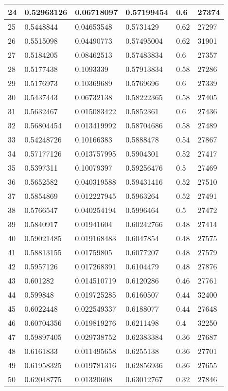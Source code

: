 \begin{longtable}{|l|l|l|l|l|l|}
24 & 0.52963126 & 0.06718097 & 0.57199454 & 0.6 & 27374 \\ \hline 
25 & 0.5448844 & 0.04653548 & 0.5731429 & 0.62 & 27297 \\ \hline 
26 & 0.5515098 & 0.04490773 & 0.57495004 & 0.62 & 31901 \\ \hline 
27 & 0.5184205 & 0.08462513 & 0.57483834 & 0.6 & 27357 \\ \hline 
28 & 0.5177438 & 0.1093339 & 0.57913834 & 0.58 & 27286 \\ \hline 
29 & 0.5176973 & 0.10369689 & 0.5769696 & 0.6 & 27339 \\ \hline 
30 & 0.5437443 & 0.06732138 & 0.58222365 & 0.58 & 27405 \\ \hline 
31 & 0.5632467 & 0.015083422 & 0.5852361 & 0.6 & 27436 \\ \hline 
32 & 0.56804454 & 0.013419992 & 0.58704686 & 0.58 & 27489 \\ \hline 
33 & 0.54248726 & 0.10166383 & 0.5888478 & 0.54 & 27867 \\ \hline 
34 & 0.57177126 & 0.013757995 & 0.5904301 & 0.52 & 27417 \\ \hline 
35 & 0.5397311 & 0.10079397 & 0.59256476 & 0.5 & 27469 \\ \hline 
36 & 0.5652582 & 0.040319588 & 0.59431416 & 0.52 & 27510 \\ \hline 
37 & 0.5854869 & 0.012227945 & 0.5963264 & 0.52 & 27491 \\ \hline 
38 & 0.5766547 & 0.040254194 & 0.5996464 & 0.5 & 27472 \\ \hline 
39 & 0.5840917 & 0.01941604 & 0.60242766 & 0.48 & 27414 \\ \hline 
40 & 0.59021485 & 0.019168483 & 0.6047854 & 0.48 & 27575 \\ \hline 
41 & 0.58813155 & 0.01759805 & 0.6077207 & 0.48 & 27579 \\ \hline 
42 & 0.5957126 & 0.017268391 & 0.6104479 & 0.48 & 27876 \\ \hline 
43 & 0.601282 & 0.014510719 & 0.6120286 & 0.46 & 27761 \\ \hline 
44 & 0.599848 & 0.019725285 & 0.6160507 & 0.44 & 32400 \\ \hline 
45 & 0.6022448 & 0.022549337 & 0.6188077 & 0.44 & 27648 \\ \hline 
46 & 0.60704356 & 0.019819276 & 0.6211498 & 0.4 & 32250 \\ \hline 
47 & 0.59897405 & 0.029738752 & 0.62383384 & 0.36 & 27687 \\ \hline 
48 & 0.6161833 & 0.011495658 & 0.6255138 & 0.36 & 27701 \\ \hline 
49 & 0.61958325 & 0.019781316 & 0.62856936 & 0.36 & 27655 \\ \hline 
50 & 0.62048775 & 0.01320608 & 0.63012767 & 0.32 & 27846 \\ \hline 
\end{longtable}